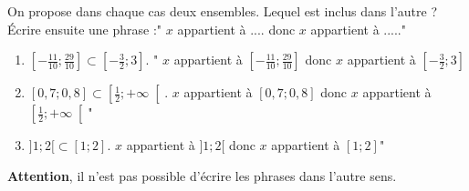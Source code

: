 
On propose dans chaque cas deux ensembles. Lequel est inclus dans l'autre ? Écrire ensuite une phrase :" $x$ appartient à .... donc $x$ appartient à ....."

\begin{enumerate}
\item $\left[ -\frac{11}{10};\frac{29}{10}\right] \subset \left[-\frac{3}{2};3 \right]$. " $x$ appartient à $\left[ -\frac{11}{10};\frac{29}{10}\right]$ donc $x$ appartient à $\left[-\frac{3}{2};3 \right]$ 
\item $[0,7;0,8] \subset \left[ \frac{1}{2}; +\infty \right[$.  $x$ appartient à $[0,7;0,8]$ donc $x$ appartient à $\left[ \frac{1}{2}; +\infty \right[$"
\item $]1;2[ \subset [1;2]$.  $x$ appartient à $]1;2[$ donc $x$ appartient à $[1;2]$"
\end{enumerate}

\textbf{Attention}, il n'est pas possible d'écrire les phrases dans l'autre sens.